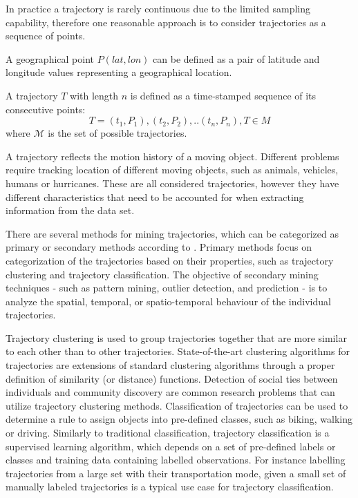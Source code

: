 In practice a trajectory is rarely continuous due to the limited sampling capability, therefore one reasonable approach is to consider trajectories as a sequence of points.

\begin{definition}
A geographical point $P(lat,lon)$ can be defined as a pair of latitude and longitude values representing a geographical location.
\end{definition}

\begin{definition}
A trajectory $T$ with length $n$ is defined as a time-stamped sequence of its consecutive points: \[T={(t_{1},P_{1}), (t_{2},P_{2}), .. (t_{n},P_{n})}, T \in M\]
where $\mathcal{M}$ is the set of possible trajectories.
\end{definition}

A trajectory reflects the motion history of a moving object. Different problems require tracking location of different moving objects, such as animals, vehicles, humans or hurricanes. These are all considered trajectories, however they have different characteristics that need to be accounted for when extracting information from the data set.

There are several methods for mining trajectories, which can be categorized as primary or secondary methods according to \cite{traj-mining-overview}. Primary methods focus on categorization of the trajectories based on their properties, such as trajectory clustering and trajectory classification. The objective of secondary mining techniques - such as pattern mining, outlier detection, and prediction - is to analyze the spatial, temporal, or spatio-temporal behaviour of the individual trajectories.

Trajectory clustering is used to group trajectories together that are more similar to each other than to other trajectories. State-of-the-art clustering algorithms for trajectories are extensions of standard clustering algorithms through a proper definition of similarity (or distance) functions. Detection of social ties between individuals and community discovery are common research problems that can utilize trajectory clustering methods. \cite{traj-mining-overview} 
Classification of trajectories can be used to determine a rule to assign objects into pre-defined classes, such as biking, walking or driving. Similarly to traditional classification, trajectory classification is a supervised learning algorithm, which depends on a set of pre-defined labels or classes and training data containing labelled observations. For instance labelling trajectories from a large set with their transportation mode, given a small set of manually labeled trajectories is a typical use case for trajectory classification. \cite{traj-mining-overview}

